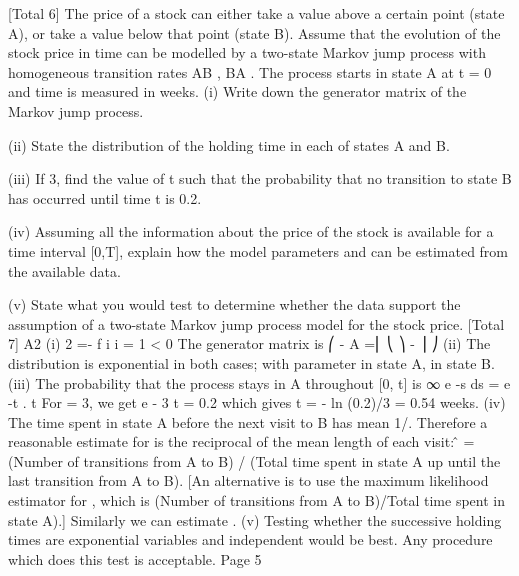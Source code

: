 \documentclass[a4paper,12pt]{article}
\begin{document}
[Total 6]
The price of a stock can either take a value above a certain point (state A), or take a
value below that point (state B). Assume that the evolution of the stock price in time
can be modelled by a two-state Markov jump process with homogeneous transition
rates AB
, BA
.
The process starts in state A at t = 0 and time is measured in weeks.
(i) Write down the generator matrix of the Markov jump process.

(ii) State the distribution of the holding time in each of states A and B.

(iii) If
3, find the value of t such that the probability that no transition to state
B has occurred until time t is 0.2.

(iv) Assuming all the information about the price of the stock is available for a
time interval [0,T], explain how the model parameters and can be
estimated from the available data.

(v) State what you would test to determine whether the data support the
assumption of a two-state Markov jump process model for the stock price. 
[Total 7]
A2
(i)
2
=-
\sum  f i
i = 1
< 0
The generator matrix is
⎛ -\sigma 
A =⎜
⎝ \rho
\sigma  ⎞
- \rho ⎟ ⎠
(ii) The distribution is exponential in both cases; with parameter \sigma  in state A, \rho in
state B.
(iii) The probability that the process stays in A throughout [0, t] is
∞
\int  \sigma  e
-\sigma  s
ds = e -\sigma  t .
t
For \sigma  = 3, we get e - 3 t = 0.2
which gives t = - ln (0.2)/3 = 0.54 weeks.
(iv)
The time spent in state A before the next visit to B has mean 1/\sigma .
Therefore a reasonable estimate for \sigma  is the reciprocal of the mean length of
each visit:
\sigma ̂ = (Number of transitions from A to B) / (Total time spent in state A up until
the last transition from A to B).
[An alternative is to use the maximum likelihood estimator for \sigma , which is
(Number of transitions from A to B)/Total time spent in state A).]
Similarly we can estimate \hat{\rho}.
(v)
Testing whether the successive holding times are exponential variables and
independent would be best. Any procedure which does this test is acceptable.
Page 5
\end{document}
